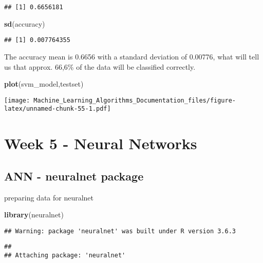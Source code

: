 \documentclass[
]{article}
\newenvironment{Shaded}{\begin{snugshade}}{\end{snugshade}}
\newcommand{\KeywordTok}[1]{\textcolor[rgb]{0.13,0.29,0.53}{\textbf{#1}}}
\newcommand{\NormalTok}[1]{#1}
\begin{document}
\begin{verbatim}
## [1] 0.6656181
\end{verbatim}

\begin{Shaded}
\begin{Highlighting}[]
\KeywordTok{sd}\NormalTok{(accuracy)}
\end{Highlighting}
\end{Shaded}

\begin{verbatim}
## [1] 0.007764355
\end{verbatim}

The accuracy mean is 0.6656 with a standard deviation of 0.00776, what
will tell us that approx. 66,6\% of the data will be classified
correctly.

\begin{Shaded}
\begin{Highlighting}[]
\KeywordTok{plot}\NormalTok{(svm_model,testset)}
\end{Highlighting}
\end{Shaded}

\texttt{[image: Machine\_Learning\_Algorithms\_Documentation\_files/figure-latex/unnamed-chunk-55-1.pdf]}

\hypertarget{week-5---neural-networks}{%
\section{Week 5 - Neural Networks}\label{week-5---neural-networks}}

\hypertarget{ann---neuralnet-package}{%
\subsection{ANN - neuralnet package}\label{ann---neuralnet-package}}

preparing data for neuralnet

\begin{Shaded}
\begin{Highlighting}[]
\KeywordTok{library}\NormalTok{(neuralnet)}
\end{Highlighting}
\end{Shaded}

\begin{verbatim}
## Warning: package 'neuralnet' was built under R version 3.6.3
\end{verbatim}

\begin{verbatim}
## 
## Attaching package: 'neuralnet'
\end{verbatim}
\end{document}
